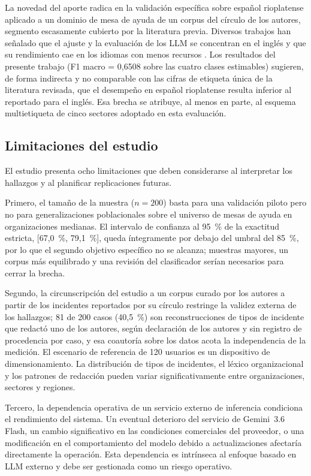 La novedad del aporte radica en la validación específica sobre español rioplatense aplicado a un dominio de mesa de ayuda de un corpus del círculo de los autores, segmento escasamente cubierto por la literatura previa. Diversos trabajos han señalado que el ajuste y la evaluación de los LLM se concentran en el inglés y que su rendimiento cae en los idiomas con menos recursos \parencite{lai2023okapi, xuan2025mmluprox}. Los resultados del presente trabajo (F1 macro = 0,6508 sobre las cuatro clases estimables) sugieren, de forma indirecta y no comparable con las cifras de etiqueta única de la literatura revisada, que el desempeño en español rioplatense resulta inferior al reportado para el inglés. Esa brecha se atribuye, al menos en parte, al esquema multietiqueta de cinco sectores adoptado en esta evaluación.

\subsection{Limitaciones del estudio}\label{subsec:limitaciones-estudio}

El estudio presenta ocho limitaciones que deben considerarse al interpretar los hallazgos y al planificar replicaciones futuras.

Primero, el tamaño de la muestra (\(n = 200\)) basta para una validación piloto pero no para generalizaciones poblacionales sobre el universo de mesas de ayuda en organizaciones medianas. El intervalo de confianza al 95~\% de la exactitud estricta, [67,0~\%, 79,1~\%], queda íntegramente por debajo del umbral del 85~\%, por lo que el segundo objetivo específico no se alcanza; muestras mayores, un corpus más equilibrado y una revisión del clasificador serían necesarios para cerrar la brecha.

Segundo, la circunscripción del estudio a un corpus curado por los autores a partir de los incidentes reportados por su círculo restringe la validez externa de los hallazgos; 81 de 200 casos (40,5~\%) son reconstrucciones de tipos de incidente que redactó uno de los autores, según declaración de los autores y sin registro de procedencia por caso, y esa coautoría sobre los datos acota la independencia de la medición. El escenario de referencia de 120 usuarios es un dispositivo de dimensionamiento. La distribución de tipos de incidentes, el léxico organizacional y los patrones de redacción pueden variar significativamente entre organizaciones, sectores y regiones.

Tercero, la dependencia operativa de un servicio externo de inferencia condiciona el rendimiento del sistema. Un eventual deterioro del servicio de Gemini~3.6 Flash, un cambio significativo en las condiciones comerciales del proveedor, o una modificación en el comportamiento del modelo debido a actualizaciones afectaría directamente la operación. Esta dependencia es intrínseca al enfoque basado en LLM externo y debe ser gestionada como un riesgo operativo.

